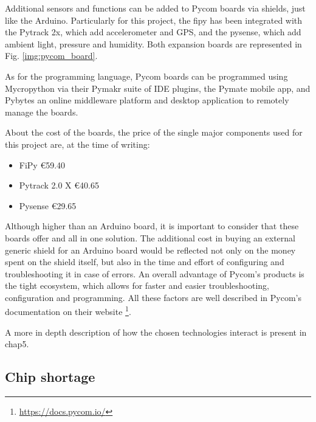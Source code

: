 			Additional sensors and functions can be added to Pycom boards via shields, just like the Arduino.
			Particularly for this project, the fipy has been integrated with the Pytrack 2x, which add accelerometer and GPS, and the pysense, which add ambient light, pressure and humidity.
			Both expansion boards are represented in Fig. \ref{img:pycom_board}.
					
			As for the programming language, Pycom boards can be programmed using Mycropython via their Pymakr suite of IDE plugins, the Pymate mobile app, and Pybytes an online middleware platform and desktop application to remotely manage the boards.
			
			About the cost of the boards, the price of the single major components used for this project are, at the time of writing:
			\begin{itemize}[noitemsep]
				\item FiPy €59.40
				\item Pytrack 2.0 X €40.65
				\item Pysense €29.65
			\end{itemize}
			
			Although higher than an Arduino board, it is important to consider that these boards offer and all in one solution.
			The additional cost in buying an external generic shield for an Arduino board would be reflected not only on the money spent on the shield itself, but also in the time and effort of configuring and troubleshooting it in case of errors.
			An overall advantage of Pycom's products is the tight ecosystem, which allows for faster and easier troubleshooting, configuration and programming.
			All these factors are well described in Pycom's documentation on their website \footnote{\url{https://docs.pycom.io/}}.
			
			A more in depth description of how the chosen technologies interact is present in chap5.	
			
		
		\subsection{Chip shortage}
		
